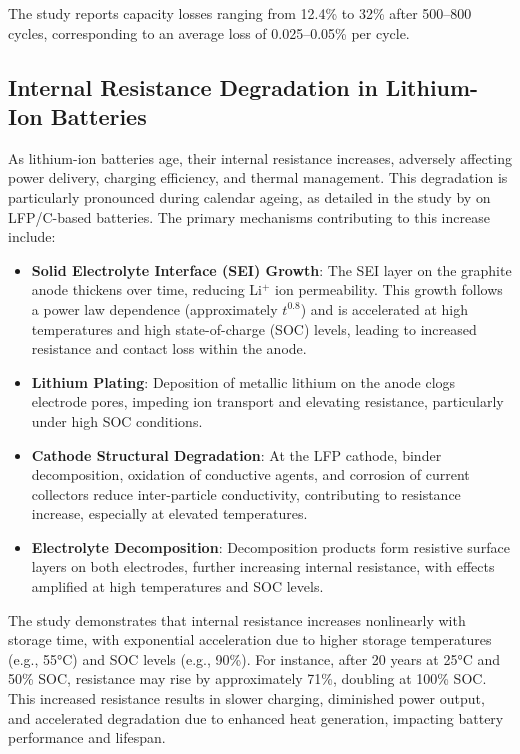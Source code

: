 The study reports capacity losses ranging from 12.4\% to 32\% after 500–800 cycles, corresponding to an average loss of 0.025–0.05\% per cycle.


\subsection{Internal Resistance Degradation in Lithium-Ion Batteries}

As lithium-ion batteries age, their internal resistance increases, adversely affecting power delivery, charging efficiency, and thermal management. This degradation is particularly pronounced during calendar ageing, as detailed in the study by \cite{stroe_degradation_2018} on LFP/C-based batteries. The primary mechanisms contributing to this increase include:

\begin{itemize}
\item \textbf{Solid Electrolyte Interface (SEI) Growth}: The SEI layer on the graphite anode thickens over time, reducing Li$^+$ ion permeability. This growth follows a power law dependence (approximately $t^{0.8}$) and is accelerated at high temperatures and high state-of-charge (SOC) levels, leading to increased resistance and contact loss within the anode.
\item \textbf{Lithium Plating}: Deposition of metallic lithium on the anode clogs electrode pores, impeding ion transport and elevating resistance, particularly under high SOC conditions.
\item \textbf{Cathode Structural Degradation}: At the LFP cathode, binder decomposition, oxidation of conductive agents, and corrosion of current collectors reduce inter-particle conductivity, contributing to resistance increase, especially at elevated temperatures.
\item \textbf{Electrolyte Decomposition}: Decomposition products form resistive surface layers on both electrodes, further increasing internal resistance, with effects amplified at high temperatures and SOC levels.
\end{itemize}

The study demonstrates that internal resistance increases nonlinearly with storage time, with exponential acceleration due to higher storage temperatures (e.g., 55°C) and SOC levels (e.g., 90\%). For instance, after 20 years at 25°C and 50\% SOC, resistance may rise by approximately 71\%, doubling at 100\% SOC. This increased resistance results in slower charging, diminished power output, and accelerated degradation due to enhanced heat generation, impacting battery performance and lifespan.


